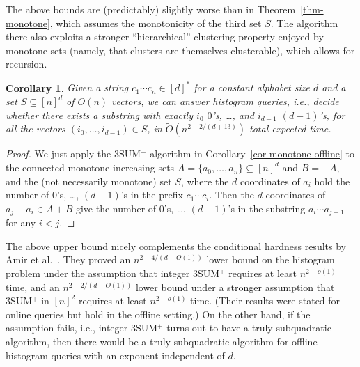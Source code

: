 \documentclass[11pt]{article}
\newcommand{\LONG}[1]{#1}\newcommand{\SHORT}[1]{}
\newtheorem{corollary}[theorem]{Corollary}
\newcommand{\OO}{\widetilde{O}}
\begin{document}
The above bounds are (predictably) slightly worse than in
Theorem~\ref{thm-monotone}, which assumes
the monotonicity of the third set $S$.  The algorithm there also
exploits a stronger ``hierarchical'' clustering property enjoyed by
monotone sets (namely, that clusters are themselves clusterable),
which allows for recursion.


\begin{corollary}\label{cor-jumble-offline}
Given a string $c_1\cdots c_n\in [d]^*$ for a constant
alphabet size $d$ and a set $S\subseteq [n]^d$ of $O(n)$ vectors,
we can answer histogram queries, i.e.,
decide whether there exists a substring with
exactly $i_0$ $0$'s, \ldots, and $i_{d-1}$ $(d-1)$'s,
for all the vectors $(i_0,\ldots,i_{d-1})\in S$,
in $\OO(n^{2-2/(d+13)})$ total expected time.
\end{corollary}
\begin{proof}
We just apply the 3SUM$^+$ algorithm in Corollary~\ref{cor-monotone-offline} to the
\LONG{connected }monotone increasing sets $A=\{a_0,\ldots,a_n\}\subseteq [n]^d$ and
$B=-A$, and the (not necessarily monotone) set $S$,
where the $d$ coordinates of $a_i$ hold the number of 0's, \ldots, $(d-1)$'s
in the prefix $c_1\cdots c_i$.
Then the $d$ coordinates of $a_j-a_i\in A+B$ give
the number of 0's, \ldots, $(d-1)$'s in the substring $a_i\cdots a_{j-1}$ for any $i < j$.
\end{proof}

The above upper bound nicely complements
the conditional hardness results by
Amir et al.~\cite{ACLL14}.  They proved an $n^{2-4/(d-O(1))}$ lower
bound on the histogram problem under the assumption that integer 3SUM$^+$ requires at least $n^{2-o(1)}$ time, and an $n^{2-2/(d-O(1))}$
lower bound under a stronger assumption that
3SUM$^+$ in $[n]^2$ requires at least $n^{2-o(1)}$ time.  (Their results
were stated for online queries but hold in the offline
setting.)  On the other hand, if the assumption fails, i.e.,
integer 3SUM$^+$ turns out to have a truly subquadratic algorithm,
then there would be a truly subquadratic algorithm
for offline histogram queries with an exponent independent of $d$.
\end{document}
